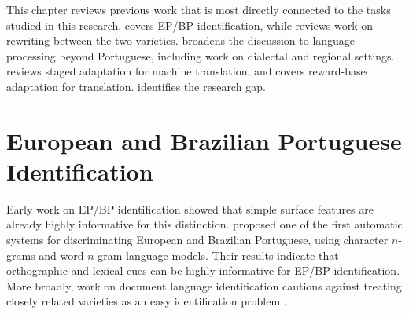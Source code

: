 \label{chap:related_work}

This chapter reviews previous work that is most directly connected to the
tasks studied in this research. 
covers EP/BP identification, while
 reviews work on rewriting between
the two varieties.  broadens the
discussion to language processing beyond Portuguese, including work on
dialectal and regional settings. 
reviews staged adaptation for machine translation, and
 covers reward-based adaptation for
translation.  identifies the research gap.

\section{European and Brazilian Portuguese Identification}
\label{sec:rw-portuguese-variety-identification}

Early work on EP/BP identification showed that simple surface features are
already highly informative for this distinction.
\citet{DBLP:conf/konvens/ZampieriG12} proposed one of the first automatic
systems for discriminating European and Brazilian Portuguese, using character
\(n\)-grams and word \(n\)-gram language models. Their results indicate that orthographic and lexical cues can be highly
informative for EP/BP identification. More broadly, work on document language
identification cautions against treating closely related varieties as an easy
identification problem \citep{4052828}.

